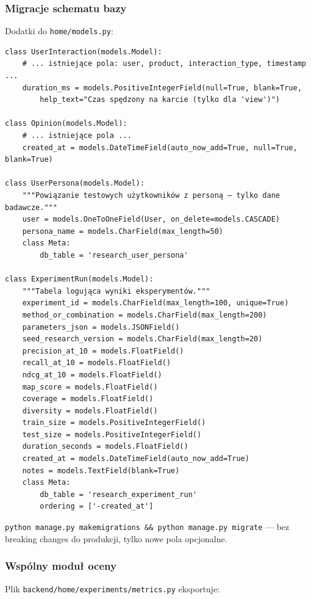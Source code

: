 \documentclass[a4paper,11pt]{article}
\newcommand{\code}[1]{\texttt{\small #1}}
\begin{document}
\subsubsection{Migracje schematu bazy}

Dodatki do \code{home/models.py}:

\begin{lstlisting}
class UserInteraction(models.Model):
    # ... istniejące pola: user, product, interaction_type, timestamp ...
    duration_ms = models.PositiveIntegerField(null=True, blank=True,
        help_text="Czas spędzony na karcie (tylko dla 'view')")

class Opinion(models.Model):
    # ... istniejące pola ...
    created_at = models.DateTimeField(auto_now_add=True, null=True, blank=True)

class UserPersona(models.Model):
    """Powiązanie testowych użytkowników z personą — tylko dane badawcze."""
    user = models.OneToOneField(User, on_delete=models.CASCADE)
    persona_name = models.CharField(max_length=50)
    class Meta:
        db_table = 'research_user_persona'

class ExperimentRun(models.Model):
    """Tabela logująca wyniki eksperymentów."""
    experiment_id = models.CharField(max_length=100, unique=True)
    method_or_combination = models.CharField(max_length=200)
    parameters_json = models.JSONField()
    seed_research_version = models.CharField(max_length=20)
    precision_at_10 = models.FloatField()
    recall_at_10 = models.FloatField()
    ndcg_at_10 = models.FloatField()
    map_score = models.FloatField()
    coverage = models.FloatField()
    diversity = models.FloatField()
    train_size = models.PositiveIntegerField()
    test_size = models.PositiveIntegerField()
    duration_seconds = models.FloatField()
    created_at = models.DateTimeField(auto_now_add=True)
    notes = models.TextField(blank=True)
    class Meta:
        db_table = 'research_experiment_run'
        ordering = ['-created_at']
\end{lstlisting}

\code{python manage.py makemigrations \&\& python manage.py migrate} --- bez breaking changes do produkcji, tylko nowe pola opcjonalne.

\subsubsection{Wspólny moduł oceny}

Plik \code{backend/home/experiments/metrics.py} eksportuje:
\end{document}
